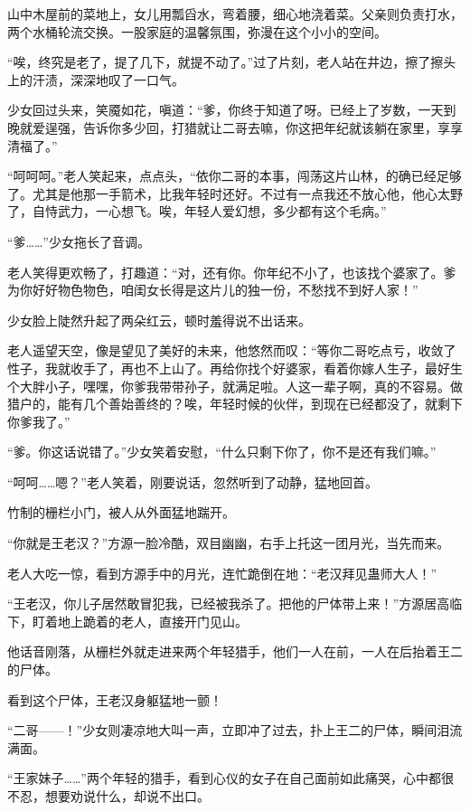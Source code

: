 \begin{this_body}
山中木屋前的菜地上，女儿用瓢舀水，弯着腰，细心地浇着菜。父亲则负责打水，两个水桶轮流交换。一股家庭的温馨氛围，弥漫在这个小小的空间。

“唉，终究是老了，提了几下，就提不动了。”过了片刻，老人站在井边，擦了擦头上的汗渍，深深地叹了一口气。

少女回过头来，笑魇如花，嗔道：“爹，你终于知道了呀。已经上了岁数，一天到晚就爱逞强，告诉你多少回，打猎就让二哥去嘛，你这把年纪就该躺在家里，享享清福了。”

“呵呵呵。”老人笑起来，点点头，“依你二哥的本事，闯荡这片山林，的确已经足够了。尤其是他那一手箭术，比我年轻时还好。不过有一点我还不放心他，他心太野了，自恃武力，一心想飞。唉，年轻人爱幻想，多少都有这个毛病。”

“爹……”少女拖长了音调。

老人笑得更欢畅了，打趣道：“对，还有你。你年纪不小了，也该找个婆家了。爹为你好好物色物色，咱闺女长得是这片儿的独一份，不愁找不到好人家！”

少女脸上陡然升起了两朵红云，顿时羞得说不出话来。

老人遥望天空，像是望见了美好的未来，他悠然而叹：“等你二哥吃点亏，收敛了性子，我就收手了，再也不上山了。再给你找个好婆家，看着你嫁人生子，最好生个大胖小子，嘿嘿，你爹我带带孙子，就满足啦。人这一辈子啊，真的不容易。做猎户的，能有几个善始善终的？唉，年轻时候的伙伴，到现在已经都没了，就剩下你爹我了。”

“爹。你这话说错了。”少女笑着安慰，“什么只剩下你了，你不是还有我们嘛。”

“呵呵……嗯？”老人笑着，刚要说话，忽然听到了动静，猛地回首。

竹制的栅栏小门，被人从外面猛地踹开。

“你就是王老汉？”方源一脸冷酷，双目幽幽，右手上托这一团月光，当先而来。

老人大吃一惊，看到方源手中的月光，连忙跪倒在地：“老汉拜见蛊师大人！”

“王老汉，你儿子居然敢冒犯我，已经被我杀了。把他的尸体带上来！”方源居高临下，盯着地上跪着的老人，直接开门见山。

他话音刚落，从栅栏外就走进来两个年轻猎手，他们一人在前，一人在后抬着王二的尸体。

看到这个尸体，王老汉身躯猛地一颤！

“二哥——！”少女则凄凉地大叫一声，立即冲了过去，扑上王二的尸体，瞬间泪流满面。

“王家妹子……”两个年轻的猎手，看到心仪的女子在自己面前如此痛哭，心中都很不忍，想要劝说什么，却说不出口。


\end{this_body}
